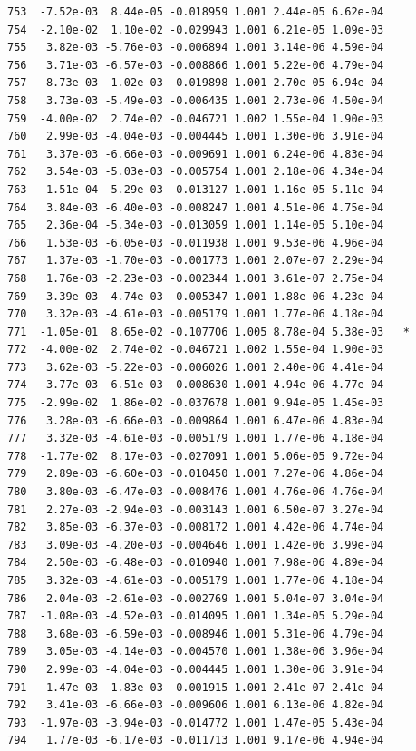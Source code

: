 \documentclass[
  letterpaper,
  DIV=11,
  numbers=noendperiod]{scrartcl}
\begin{document}
\begin{verbatim}
753  -7.52e-03  8.44e-05 -0.018959 1.001 2.44e-05 6.62e-04    
754  -2.10e-02  1.10e-02 -0.029943 1.001 6.21e-05 1.09e-03    
755   3.82e-03 -5.76e-03 -0.006894 1.001 3.14e-06 4.59e-04    
756   3.71e-03 -6.57e-03 -0.008866 1.001 5.22e-06 4.79e-04    
757  -8.73e-03  1.02e-03 -0.019898 1.001 2.70e-05 6.94e-04    
758   3.73e-03 -5.49e-03 -0.006435 1.001 2.73e-06 4.50e-04    
759  -4.00e-02  2.74e-02 -0.046721 1.002 1.55e-04 1.90e-03    
760   2.99e-03 -4.04e-03 -0.004445 1.001 1.30e-06 3.91e-04    
761   3.37e-03 -6.66e-03 -0.009691 1.001 6.24e-06 4.83e-04    
762   3.54e-03 -5.03e-03 -0.005754 1.001 2.18e-06 4.34e-04    
763   1.51e-04 -5.29e-03 -0.013127 1.001 1.16e-05 5.11e-04    
764   3.84e-03 -6.40e-03 -0.008247 1.001 4.51e-06 4.75e-04    
765   2.36e-04 -5.34e-03 -0.013059 1.001 1.14e-05 5.10e-04    
766   1.53e-03 -6.05e-03 -0.011938 1.001 9.53e-06 4.96e-04    
767   1.37e-03 -1.70e-03 -0.001773 1.001 2.07e-07 2.29e-04    
768   1.76e-03 -2.23e-03 -0.002344 1.001 3.61e-07 2.75e-04    
769   3.39e-03 -4.74e-03 -0.005347 1.001 1.88e-06 4.23e-04    
770   3.32e-03 -4.61e-03 -0.005179 1.001 1.77e-06 4.18e-04    
771  -1.05e-01  8.65e-02 -0.107706 1.005 8.78e-04 5.38e-03   *
772  -4.00e-02  2.74e-02 -0.046721 1.002 1.55e-04 1.90e-03    
773   3.62e-03 -5.22e-03 -0.006026 1.001 2.40e-06 4.41e-04    
774   3.77e-03 -6.51e-03 -0.008630 1.001 4.94e-06 4.77e-04    
775  -2.99e-02  1.86e-02 -0.037678 1.001 9.94e-05 1.45e-03    
776   3.28e-03 -6.66e-03 -0.009864 1.001 6.47e-06 4.83e-04    
777   3.32e-03 -4.61e-03 -0.005179 1.001 1.77e-06 4.18e-04    
778  -1.77e-02  8.17e-03 -0.027091 1.001 5.06e-05 9.72e-04    
779   2.89e-03 -6.60e-03 -0.010450 1.001 7.27e-06 4.86e-04    
780   3.80e-03 -6.47e-03 -0.008476 1.001 4.76e-06 4.76e-04    
781   2.27e-03 -2.94e-03 -0.003143 1.001 6.50e-07 3.27e-04    
782   3.85e-03 -6.37e-03 -0.008172 1.001 4.42e-06 4.74e-04    
783   3.09e-03 -4.20e-03 -0.004646 1.001 1.42e-06 3.99e-04    
784   2.50e-03 -6.48e-03 -0.010940 1.001 7.98e-06 4.89e-04    
785   3.32e-03 -4.61e-03 -0.005179 1.001 1.77e-06 4.18e-04    
786   2.04e-03 -2.61e-03 -0.002769 1.001 5.04e-07 3.04e-04    
787  -1.08e-03 -4.52e-03 -0.014095 1.001 1.34e-05 5.29e-04    
788   3.68e-03 -6.59e-03 -0.008946 1.001 5.31e-06 4.79e-04    
789   3.05e-03 -4.14e-03 -0.004570 1.001 1.38e-06 3.96e-04    
790   2.99e-03 -4.04e-03 -0.004445 1.001 1.30e-06 3.91e-04    
791   1.47e-03 -1.83e-03 -0.001915 1.001 2.41e-07 2.41e-04    
792   3.41e-03 -6.66e-03 -0.009606 1.001 6.13e-06 4.82e-04    
793  -1.97e-03 -3.94e-03 -0.014772 1.001 1.47e-05 5.43e-04    
794   1.77e-03 -6.17e-03 -0.011713 1.001 9.17e-06 4.94e-04    

\end{verbatim}
\end{document}
